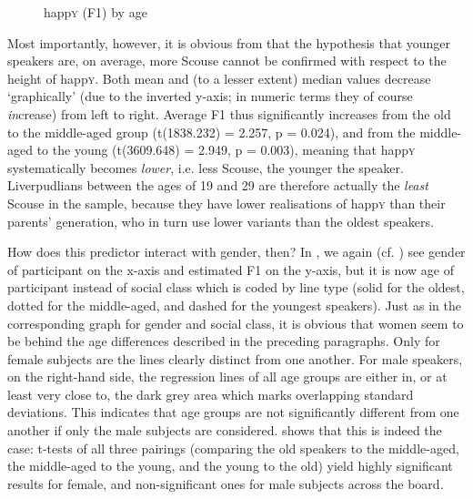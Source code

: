 \begin{figure}
	
		\resizebox{0.5\linewidth}{!}{} 
	\caption{happ\textsc{y} (F1) by age}
	\label{fig.box.f1w.happy.tot}
\end{figure}

Most importantly, however, it is obvious from  that the hypothesis that younger speakers are, on average, more Scouse cannot be confirmed with respect to the height of happ\textsc{y}.
Both mean and (to a lesser extent) median values decrease `graphically' (due to the inverted y-axis; in numeric terms they of course \emph{in}crease) from left to right.
Average F1 thus significantly increases from the old to the middle-aged group (t(1838.232) = 2.257, p = 0.024), and from the middle-aged to the young (t(3609.648) = 2.949, p = 0.003), meaning that happ\textsc{y} systematically becomes \emph{lower}, i.e. less Scouse, the younger the speaker.
Liverpudlians between the ages of 19 and 29 are therefore actually the \emph{least} Scouse in the sample, because they have lower realisations of happ\textsc{y} than their parents' generation, who in turn use lower variants than the oldest speakers.

How does this predictor interact with gender, then?
In , we again (cf. ) see gender of participant on the x-axis and estimated F1 on the y-axis, but it is now age of participant instead of social class which is coded by line type (solid for the oldest, dotted for the middle-aged, and dashed for the youngest speakers).
Just as in the corresponding graph for gender and social class, it is obvious that women seem to be behind the age differences described in the preceding paragraphs.
Only for female subjects are the lines clearly distinct from one another.
For male speakers, on the right-hand side, the regression lines of all age groups are either in, or at least very close to, the dark grey area which marks overlapping standard deviations.
This indicates that age groups are not significantly different from one another if only the male subjects are considered.
 shows that this is indeed the case: t-tests of all three pairings (comparing the old speakers to the middle-aged, the middle-aged to the young, and the young to the old) yield highly significant results for female, and non-significant ones for male subjects across the board.

